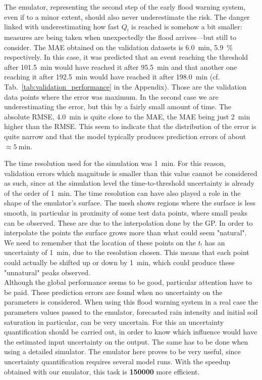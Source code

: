 The emulator, representing the second step of the early flood warning system, even if to a minor extent, should also never underestimate the risk.
The danger linked with underestimating how fast $Q_!$ is reached is somehow a bit smaller: measures are being taken when unexpectedly the flood arrives---but still to consider.
The MAE obtained on the validation datasets is \SI{6.0}{\minute}, \SI{5.9}{\percent} respectively.
In this case, it was predicted that an event reaching the threshold after \SI{101.5}{\minute} would have reached it after \SI{95.5}{\minute} and that another one reaching it after \SI{192.5}{\minute} would have reached it after \SI{198.0}{\minute} (cf. Tab.~\ref{tab:validation_performance} in the Appendix).
Those are the validation data points where the error was maximum.
In the second case we are underestimating the error, but this by a fairly small amount of time.
The absolute RMSE, \SI{4.0}{\minute} is quite close to the MAE, the MAE being just \SI{2}{\minute} higher than the RMSE.
This seem to indicate that the distribution of the error is quite narrow and that the model typically produces prediction errors of about $\approx \SI{5}{\minute}$.

The time resolution used for the simulation was \SI{1}{\minute}.
For this reason, validation errors which magnitude is smaller than this value cannot be considered as such, since at the simulation level the time-to-threshold uncertainty is already of the order of \SI{1}{\minute}.
The time resolution can have also played a role in the shape of the emulator's surface.
The mesh shows regions where the surface is less smooth, in particular in proximity of some test data points, where small peaks can be observed.
These are due to the interpolation done by the GP.
In order to interpolate the points the surface grows more than what could seem "natural".
We need to remember that the location of these points on the $t_!$ has an uncertainty of \SI{1}{\minute}, due to the resolution chosen.
This means that each point could actually be shifted up or down by \SI{1}{\minute}, which could produce these "unnatural" peaks observed.\\

Although the global performance seems to be good, particular attention have to be paid.
These prediction errors are found when no uncertainty on the parameters is considered.
When using this flood warning system in a real case the parameters values passed to the emulator, forecasted rain intensity and initial soil saturation in particular, can be very uncertain.
For this an uncertainty quantification should be carried out, in order to know which influence would have the estimated input uncertainty on the output.
The same has to be done when using a detailed simulator.
The emulator here proves to be very useful, since uncertainty quantification requires several model runs.
With the speedup obtained with our emulator, this task is \textbf{\num{150000}} more efficient.

